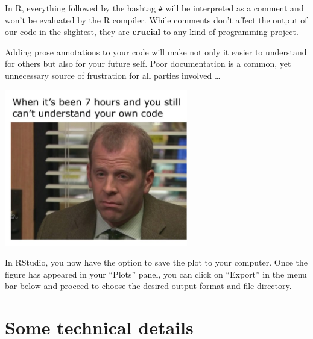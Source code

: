\documentclass[
  11pt,
  letterpaper,
  DIV=11,
  numbers=noendperiod]{scrreprt}
\begin{document}
\begin{tcolorbox}[enhanced jigsaw, toprule=.15mm, opacitybacktitle=0.6, coltitle=black, arc=.35mm, colback=white, title=\textcolor{quarto-callout-tip-color}{\faLightbulb}\hspace{0.5em}{What does `\#' mean? On comments in R}, titlerule=0mm, toptitle=1mm, bottomtitle=1mm, breakable, rightrule=.15mm, opacityback=0, bottomrule=.15mm, leftrule=.75mm, colframe=quarto-callout-tip-color-frame, left=2mm, colbacktitle=quarto-callout-tip-color!10!white]

In R, everything followed by the hashtag \texttt{\#} will be interpreted
as a comment and won't be evaluated by the R compiler. While comments
don't affect the output of our code in the slightest, they are
\textbf{crucial} to any kind of programming project.

Adding prose annotations to your code will make not only it easier to
understand for others but also for your future self. Poor documentation
is a common, yet unnecessary source of frustration for all parties
involved \ldots{}

\begin{center}
\includegraphics[width=0.6\textwidth,height=\textheight]{comments_meme.png}
\end{center}

\end{tcolorbox}

In RStudio, you now have the option to save the plot to your computer.
Once the figure has appeared in your ``Plots'' panel, you can click on
``Export'' in the menu bar below and proceed to choose the desired
output format and file directory.

\section{Some technical details}\label{some-technical-details}
\end{document}
